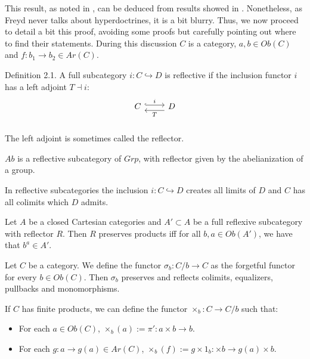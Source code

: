 This result, as noted in \cites{seely1984locally}, can be deduced from results showed in \cite[Section 1.3]{freyd1972aspects}. Nonetheless, as Freyd never talks about hyperdoctrines, it is a bit blurry. Thus, we now proceed to detail a bit this proof, avoiding some proofs but carefully pointing out where to find their statements. During this discussion $C$ is a category, $a,b\in Ob(C)$ and $f:b_1\to b_2\in Ar(C)$.\\


\begin{definition}
  Definition 2.1. A full subcategory $i:C\hookrightarrow D$ is reflective if the inclusion functor $i$ has a left adjoint $T\dashv i$:
  \[
    \begin{tikzcd}
      C\arrow[hookrightarrow, shift left=.5ex, "i"{name=T}]{r}{} &
      D\arrow[ shift left=1ex, "T"{name=i}]{l}{} \\
    \end{tikzcd}
  \]
  The left adjoint is sometimes called the reflector.
\end{definition}

\begin{example}
  $Ab$ is a reflective subcategory of $Grp$, with reflector given by the abelianization of a group.
\end{example}


\begin{proposition}
  In reflective subcategories the inclusion $i:C\hookrightarrow D$ creates all limits of $D$ and $C$ has all colimits which $D$ admits.
\end{proposition}


\begin{theorem}
  Let $A$ be a closed Cartesian categories and $A'\subset A$ be a full reflexive subcategory with reflector  $R$. Then $R$ preserves products iff for all $b,a\in Ob(A')$, we have that $b^a\in A'$.
\end{theorem}
\begin{corollary}
  Let $C$ be a category. We define the functor $\sigma_b : C/b \to C$ as the forgetful functor for every $b\in Ob(C)$. Then $\sigma_b$ preserves and reflects colimits, equalizers, pullbacks and monomorphisms.
\end{corollary}

If $C$ has finite products, we can define the functor $\times_b: C \to C/b$ such that:
\begin{itemize}
\item For each $a\in Ob(C)$, $\times_b(a) := \pi':a\times b \to b$.
\item For each $g:a\to g(a)\in Ar(C)$, $\times_b(f) := g\times 1_{b}: \times b \to g(a)\times b$.
\end{itemize}


